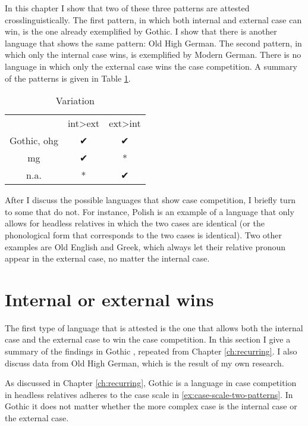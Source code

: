 In this chapter I show that two of these three patterns are attested crosslinguistically. The first pattern, in which both internal and external case can win, is the one already exemplified by Gothic. I show that there is another language that shows the same pattern: Old High German. The second pattern, in which only the internal case wins, is exemplified by Modern German. There is no language in which only the external case wins the case competition. A summary of the patterns is given in Table \ref{tbl:competition-summary}.

\begin{table}[H]
 \center
 \caption {Variation}
  \begin{tabular}{ccc}
  \toprule
                    & \ac{int}>\ac{ext}  & \ac{ext}>\ac{int} \\
                    \cmidrule{2-3}
  Gothic, \ac{ohg}  & ✔                  & ✔                 \\
  \ac{mg}           & ✔                  & *                 \\
  n.a.              & *                  & ✔                 \\
  \bottomrule
\end{tabular}\label{tbl:competition-summary}
\end{table}

After I discuss the possible languages that show case competition, I briefly turn to some that do not.
For instance, Polish is an example of a language that only allows for headless relatives in which the two cases are identical (or the phonological form that corresponds to the two cases is identical).
Two other examples are Old English and Greek, which always let their relative pronoun appear in the external case, no matter the internal case.


\section{Internal or external wins}

The first type of language that is attested is the one that allows both the internal case and the external case to win the case competition. In this section I give a summary of the findings in Gothic \citep{harbert1978}, repeated from Chapter \ref{ch:recurring}. I also discuss data from Old High German, which is the result of my own research.

As discussed in Chapter \ref{ch:recurring}, Gothic is a language in case competition in headless relatives adheres to the case scale in \ref{ex:case-scale-two-patterns}. In Gothic it does not matter whether the more complex case is the internal case or the external case.

